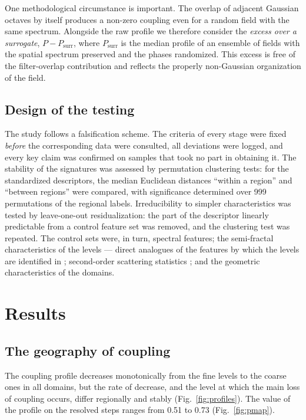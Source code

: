 \documentclass[11pt,a4paper]{article}
\begin{document}
One methodological circumstance is important. The overlap of adjacent Gaussian octaves by itself produces a non-zero coupling even for a random field with the same spectrum. Alongside the raw profile we therefore consider the \emph{excess over a surrogate}, $P-P_{\mathrm{surr}}$, where $P_{\mathrm{surr}}$ is the median profile of an ensemble of fields with the spatial spectrum preserved and the phases randomized. This excess is free of the filter-overlap contribution and reflects the properly non-Gaussian organization of the field.

\subsection{Design of the testing}

The study follows a falsification scheme. The criteria of every stage were fixed \emph{before} the corresponding data were consulted, all deviations were logged, and every key claim was confirmed on samples that took no part in obtaining it. The stability of the signatures was assessed by permutation clustering tests: for the standardized descriptors, the median Euclidean distances ``within a region'' and ``between regions'' were compared, with significance determined over 999 permutations of the regional labels. Irreducibility to simpler characteristics was tested by leave-one-out residualization: the part of the descriptor linearly predictable from a control feature set was removed, and the clustering test was repeated. The control sets were, in turn, spectral features; the semi-fractal characteristics of the levels --- direct analogues of the features by which the levels are identified in \cite{Krenke2019}; second-order scattering statistics \cite{Cheng2024}; and the geometric characteristics of the domains.

\section{Results}
\label{sec:results}

\subsection{The geography of coupling}

The coupling profile decreases monotonically from the fine levels to the coarse ones in all domains, but the rate of decrease, and the level at which the main loss of coupling occurs, differ regionally and stably (Fig.~\ref{fig:profiles}). The value of the profile on the resolved steps ranges from 0.51 to 0.73 (Fig.~\ref{fig:pmap}).
\end{document}
